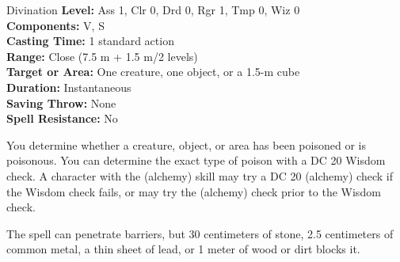 {Divination}
{
	\textbf{Level:}
	Ass 1, Clr 0, Drd 0, Rgr 1, Tmp 0, Wiz 0\\
	\textbf{Components:}
	V, S\\
	\textbf{Casting Time:}
	1 standard action\\
	\textbf{Range:}
	Close (7.5 m + 1.5 m/2 levels)\\
	\textbf{Target or Area:}
	One creature, one object, or a 1.5-m cube\\
	\textbf{Duration:}
	Instantaneous\\
	\textbf{Saving Throw:}
	None\\
	\textbf{Spell Resistance:}
	No\\
}
{
	You determine whether a creature, object, or area has been poisoned or is poisonous. You can determine the exact type of poison with a DC 20 Wisdom check. A character with the  (alchemy) skill may try a DC 20  (alchemy) check if the Wisdom check fails, or may try the  (alchemy) check prior to the Wisdom check.

	The spell can penetrate barriers, but 30 centimeters of stone, 2.5 centimeters of common metal, a thin sheet of lead, or 1 meter of wood or dirt blocks it.

}
